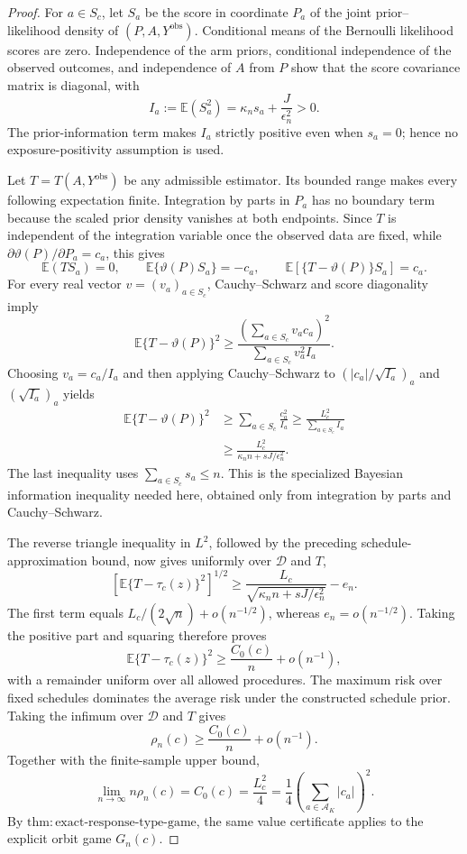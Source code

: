 \documentclass{article}
\begin{document}
\begin{proof}
For \(a\in S_c\), let \(S_a\) be the score in coordinate \(P_a\) of the
joint prior--likelihood density of \((P,A,Y^{\mathrm{obs}})\).  Conditional
means of the Bernoulli likelihood scores are zero.  Independence of the arm
priors, conditional independence of the observed outcomes, and independence
of \(A\) from \(P\) show that the score covariance matrix is diagonal, with
\[
 I_a:=\mathbb E(S_a^2)
 =\kappa_ns_a+\frac{J}{\epsilon_n^2}>0.
\]
The prior-information term makes \(I_a\) strictly positive even when
\(s_a=0\); hence no exposure-positivity assumption is used.

Let \(T=T(A,Y^{\mathrm{obs}})\) be any admissible estimator.  Its bounded
range makes every following expectation finite.  Integration by parts in
\(P_a\) has no boundary term because the scaled prior density vanishes at
both endpoints.  Since \(T\) is independent of the integration variable
once the observed data are fixed, while
\(\partial\vartheta(P)/\partial P_a=c_a\), this gives
\[
 \mathbb E(TS_a)=0,
 \qquad
 \mathbb E\{\vartheta(P)S_a\}=-c_a,
 \qquad
 \mathbb E[\{T-\vartheta(P)\}S_a]=c_a.
\]
For every real vector \(v=(v_a)_{a\in S_c}\), Cauchy--Schwarz and score
diagonality imply
\[
 \mathbb E\{T-\vartheta(P)\}^2
 \ge
 \frac{(\sum_{a\in S_c}v_ac_a)^2}
 {\sum_{a\in S_c}v_a^2I_a}.
\]
Choosing \(v_a=c_a/I_a\) and then applying Cauchy--Schwarz to
\((|c_a|/\sqrt{I_a})_a\) and \((\sqrt{I_a})_a\) yields
\[
 \begin{aligned}
 \mathbb E\{T-\vartheta(P)\}^2
 &\ge\sum_{a\in S_c}\frac{c_a^2}{I_a}
 \ge\frac{L_c^2}{\sum_{a\in S_c}I_a}\\
 &\ge\frac{L_c^2}{\kappa_n n+sJ/\epsilon_n^2}.
 \end{aligned}
\]
The last inequality uses \(\sum_{a\in S_c}s_a\le n\).  This is the
specialized Bayesian information inequality needed here, obtained only
from integration by parts and Cauchy--Schwarz.

The reverse triangle inequality in \(L^2\), followed by the preceding
schedule-approximation bound, now gives uniformly over \(\mathcal D\) and
\(T\),
\[
 \left[\mathbb E\{T-\tau_c(z)\}^2\right]^{1/2}
 \ge
 \frac{L_c}{\sqrt{\kappa_n n+sJ/\epsilon_n^2}}-e_n.
\]
The first term equals \(L_c/(2\sqrt n)+o(n^{-1/2})\), whereas
\(e_n=o(n^{-1/2})\).  Taking the positive part and squaring therefore
proves
\[
 \mathbb E\{T-\tau_c(z)\}^2
 \ge \frac{C_0(c)}n+o(n^{-1}),
\]
with a remainder uniform over all allowed procedures.  The maximum risk
over fixed schedules dominates the average risk under the constructed
schedule prior.  Taking the infimum over \(\mathcal D\) and \(T\) gives
\[
 \rho_n(c)\ge\frac{C_0(c)}n+o(n^{-1}).
\]
Together with the finite-sample upper bound,
\[
 \lim_{n\to\infty}n\rho_n(c)
 =C_0(c)=\frac{L_c^2}{4}
 =\frac14\left(\sum_{a\in\mathcal A_K}|c_a|\right)^2.
\]
By \(\mathrm{thm:exact\text{-}response\text{-}type\text{-}game}\), the same
value certificate applies to the explicit orbit game \(G_n(c)\).


\end{proof}
\end{document}
